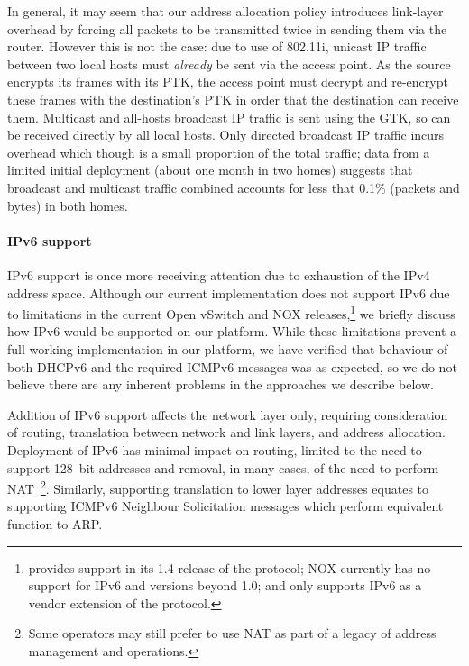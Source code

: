 In general, it may seem that our address allocation policy introduces link-layer
overhead by forcing all packets to be transmitted twice in sending them via the
router.  However this is not the case: due to use of 802.11i, unicast IP traffic
between two local hosts must \emph{already} be sent via the access point.  As
the source encrypts its frames with its PTK, the access point must decrypt and
re-encrypt these frames with the destination's PTK in order that the destination
can receive them.  Multicast and all-hosts broadcast IP traffic is sent using
the GTK, so can be received directly by all local hosts.  Only directed
broadcast IP traffic incurs overhead which though is a small proportion of the
total traffic; data from a limited initial deployment (about one month in two
homes) suggests that broadcast and multicast traffic combined accounts for less
that 0.1\% (packets and bytes) in both homes.

\paragraph{IPv6 support} 

IPv6 support is once more receiving attention due to exhaustion of the
IPv4 address space.  Although our current implementation does not support IPv6
due to limitations in the current Open vSwitch and NOX releases,\footnote{\of
  provides support in its 1.4 release of the protocol; NOX currently has no
  support for IPv6 and \of versions beyond 1.0; and \ovs only supports IPv6 as a vendor extension of the
  \of protocol.} we briefly discuss how IPv6 would be supported on our
platform.  While these limitations prevent a full working implementation in our
platform, we have verified that behaviour of both DHCPv6 and the required ICMPv6
messages was as expected, so we do not believe there are any inherent problems
in the approaches we describe below.

Addition of IPv6 support affects the network layer only, requiring consideration
of routing, translation between network and link layers, and address
allocation.  Deployment of IPv6 has minimal impact on routing, limited to the
need to support 128~bit addresses and removal, in many cases, of the need to
perform NAT~\footnote{Some operators may still prefer to use NAT as part of a
  legacy of address management and operations.}.  Similarly, supporting
translation to lower layer addresses equates to supporting ICMPv6 Neighbour
Solicitation messages which perform equivalent function to ARP.

